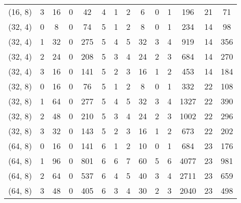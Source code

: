 \begin{tabular}{|c|c||c|c|c|c|c|c|c|c||c|c|c|c|}
  (16, 8) &          3 &  16 &  0 &  42 & 4 & 1 &  2 &  6 &  0 &                 1 &   196 &     21 &          71 \\
  (32, 4) &          0 &   8 &  0 &  74 & 5 & 1 &  2 &  8 &  0 &                 1 &   234 &     14 &          98 \\
  (32, 4) &          1 &  32 &  0 & 275 & 5 & 4 &  5 & 32 &  3 &                 4 &   919 &     14 &         356 \\
  (32, 4) &          2 &  24 &  0 & 208 & 5 & 3 &  4 & 24 &  2 &                 3 &   684 &     14 &         270 \\
  (32, 4) &          3 &  16 &  0 & 141 & 5 & 2 &  3 & 16 &  1 &                 2 &   453 &     14 &         184 \\
  (32, 8) &          0 &  16 &  0 &  76 & 5 & 1 &  2 &  8 &  0 &                 1 &   332 &     22 &         108 \\
  (32, 8) &          1 &  64 &  0 & 277 & 5 & 4 &  5 & 32 &  3 &                 4 &  1327 &     22 &         390 \\
  (32, 8) &          2 &  48 &  0 & 210 & 5 & 3 &  4 & 24 &  2 &                 3 &  1002 &     22 &         296 \\
  (32, 8) &          3 &  32 &  0 & 143 & 5 & 2 &  3 & 16 &  1 &                 2 &   673 &     22 &         202 \\
  (64, 8) &          0 &  16 &  0 & 141 & 6 & 1 &  2 & 10 &  0 &                 1 &   684 &     23 &         176 \\
  (64, 8) &          1 &  96 &  0 & 801 & 6 & 6 &  7 & 60 &  5 &                 6 &  4077 &     23 &         981 \\
  (64, 8) &          2 &  64 &  0 & 537 & 6 & 4 &  5 & 40 &  3 &                 4 &  2711 &     23 &         659 \\
  (64, 8) &          3 &  48 &  0 & 405 & 6 & 3 &  4 & 30 &  2 &                 3 &  2040 &     23 &         498 \\
\bottomrule
\end{tabular}
